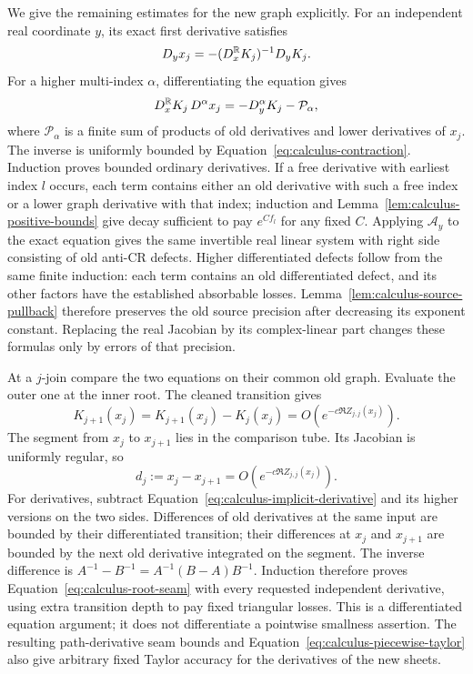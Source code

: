 We give the remaining estimates for the new graph explicitly.  For an
independent real coordinate $y$, its exact first derivative satisfies
\begin{equation}
 D_yx_j=-(D_x^{\mathbb{R}}K_j)^{-1}D_yK_j.
 \label{eq:calculus-implicit-derivative}
\end{equation}
For a higher multi-index $\alpha$, differentiating the equation gives
\[
 D_x^{\mathbb{R}}K_j\,D^\alpha x_j
 =-D_y^\alpha K_j-\mathcal P_\alpha,
\]
where $\mathcal P_\alpha$ is a finite sum of products of old derivatives
and lower derivatives of $x_j$.  The inverse is uniformly bounded by
Equation~\eqref{eq:calculus-contraction}.  Induction proves bounded
ordinary derivatives.  If a free derivative with earliest index $l$
occurs, each term contains either an old derivative with such a free
index or a lower graph derivative with that index; induction and
Lemma~\ref{lem:calculus-positive-bounds} give decay sufficient to pay
$e^{C f_l}$ for any fixed $C$.  Applying $\mathcal A_y$ to the exact
equation gives the same invertible real linear system with right side
consisting of old anti-CR defects.  Higher differentiated defects follow
from the same finite induction: each term contains an old differentiated
defect, and its other factors have the established absorbable losses.
Lemma~\ref{lem:calculus-source-pullback} therefore preserves the old source
precision after decreasing its exponent constant.  Replacing the real Jacobian by its
complex-linear part changes these formulas only by errors of that
precision.

At a $j$-join compare the two equations on their common old graph.
Evaluate the outer one at the inner root.  The cleaned transition gives
\[
 K_{j+1}(x_j)
 =K_{j+1}(x_j)-K_j(x_j)
 =O(e^{-c\Re Z_{j,j}(x_j)}).
\]
The segment from $x_j$ to $x_{j+1}$ lies in the comparison tube.  Its
Jacobian is uniformly regular, so
\begin{equation}
 d_j:=x_j-x_{j+1}
   =O(e^{-c\Re Z_{j,j}(x_j)}).
 \label{eq:calculus-root-seam}
\end{equation}
For derivatives, subtract Equation~\eqref{eq:calculus-implicit-derivative}
and its higher versions on the two sides.  Differences of old derivatives
at the same input are bounded by their differentiated transition; their
differences at $x_j$ and $x_{j+1}$ are bounded by the next old derivative
integrated on the segment.  The inverse difference is
$A^{-1}-B^{-1}=A^{-1}(B-A)B^{-1}$.  Induction therefore proves
Equation~\eqref{eq:calculus-root-seam} with every requested independent
derivative, using extra transition depth to pay fixed triangular losses.
This is a differentiated equation argument; it does not differentiate a
pointwise smallness assertion.  The resulting path-derivative seam bounds
and Equation~\eqref{eq:calculus-piecewise-taylor} also give arbitrary
fixed Taylor accuracy for the derivatives of the new sheets.

